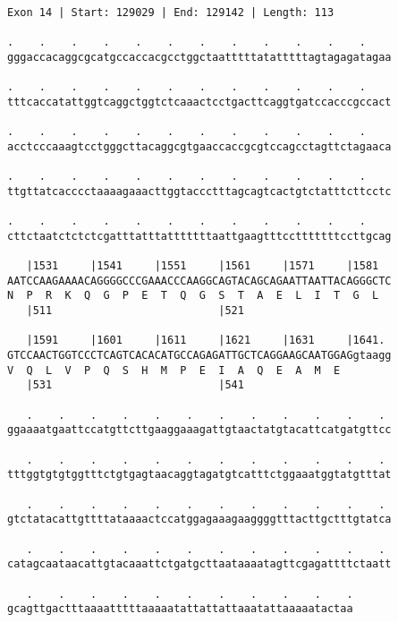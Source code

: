 \documentclass{article}
\begin{document}
\begin{Verbatim}[fontfamily=courier]
Exon 14 | Start: 129029 | End: 129142 | Length: 113

.    .    .    .    .    .    .    .    .    .    .    .    
gggaccacaggcgcatgccaccacgcctggctaatttttatatttttagtagagatagaa

.    .    .    .    .    .    .    .    .    .    .    .    
tttcaccatattggtcaggctggtctcaaactcctgacttcaggtgatccacccgccact

.    .    .    .    .    .    .    .    .    .    .    .    
acctcccaaagtcctgggcttacaggcgtgaaccaccgcgtccagcctagttctagaaca

.    .    .    .    .    .    .    .    .    .    .    .    
ttgttatcacccctaaaagaaacttggtaccctttagcagtcactgtctatttcttcctc

.    .    .    .    .    .    .    .    .    .    .    .    
cttctaatctctctcgatttatttatttttttaattgaagtttcctttttttccttgcag

   |1531     |1541     |1551     |1561     |1571     |1581  
AATCCAAGAAAACAGGGGCCCGAAACCCAAGGCAGTACAGCAGAATTAATTACAGGGCTC
N  P  R  K  Q  G  P  E  T  Q  G  S  T  A  E  L  I  T  G  L  
   |511                          |521                       

   |1591     |1601     |1611     |1621     |1631     |1641. 
GTCCAACTGGTCCCTCAGTCACACATGCCAGAGATTGCTCAGGAAGCAATGGAGgtaagg
V  Q  L  V  P  Q  S  H  M  P  E  I  A  Q  E  A  M  E        
   |531                          |541                       

   .    .    .    .    .    .    .    .    .    .    .    . 
ggaaaatgaattccatgttcttgaaggaaagattgtaactatgtacattcatgatgttcc

   .    .    .    .    .    .    .    .    .    .    .    . 
tttggtgtgtggtttctgtgagtaacaggtagatgtcatttctggaaatggtatgtttat

   .    .    .    .    .    .    .    .    .    .    .    . 
gtctatacattgttttataaaactccatggagaaagaaggggtttacttgctttgtatca

   .    .    .    .    .    .    .    .    .    .    .    . 
catagcaataacattgtacaaattctgatgcttaataaaatagttcgagattttctaatt

   .    .    .    .    .    .    .    .    .    .    .
gcagttgactttaaaatttttaaaaatattattattaaatattaaaaatactaa
\end{Verbatim}
\newpage
\end{document}
